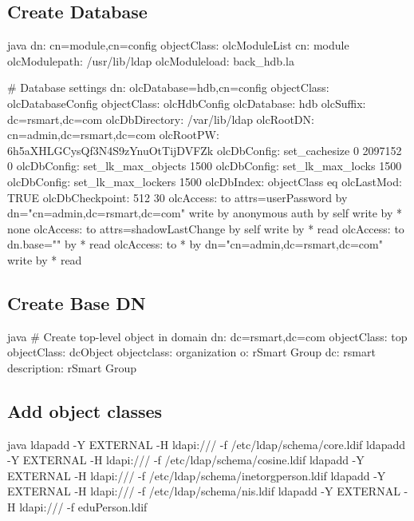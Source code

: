 \documentclass[12pt,notitlepage]{article}
\begin{document}
\begin{s5presentation}
\begin{s5slide}
    \W \end{s5slide}

%
%
  \W \begin{s5slide}
    \section{Create Database}
    \begin{code}{java}
dn: cn=module,cn=config
objectClass: olcModuleList
cn: module
olcModulepath: /usr/lib/ldap
olcModuleload: back_hdb.la

# Database settings
dn: olcDatabase=hdb,cn=config
objectClass: olcDatabaseConfig
objectClass: olcHdbConfig
olcDatabase: hdb
olcSuffix: dc=rsmart,dc=com
olcDbDirectory: /var/lib/ldap
olcRootDN: cn=admin,dc=rsmart,dc=com
olcRootPW: 6h5aXHLGCysQf3N4S9zYnuOtTijDVFZk
olcDbConfig: set_cachesize 0 2097152 0
olcDbConfig: set_lk_max_objects 1500
olcDbConfig: set_lk_max_locks 1500
olcDbConfig: set_lk_max_lockers 1500
olcDbIndex: objectClass eq
olcLastMod: TRUE
olcDbCheckpoint: 512 30
olcAccess: to attrs=userPassword by dn="cn=admin,dc=rsmart,dc=com" write by anonymous auth by self write by * none
olcAccess: to attrs=shadowLastChange by self write by * read
olcAccess: to dn.base="" by * read
olcAccess: to * by dn="cn=admin,dc=rsmart,dc=com" write by * read\
    \end{code}

    \W \end{s5slide}


%
%
  \W \begin{s5slide}
    \section{Create Base DN}
    \begin{code}{java}
# Create top-level object in domain
dn: dc=rsmart,dc=com
objectClass: top
objectClass: dcObject
objectclass: organization
o: rSmart Group
dc: rsmart
description: rSmart Group
    \end{code}

    \W \end{s5slide}

%
%
  \W \begin{s5slide}
    \section{Add object classes}
\begin{code}{java}
ldapadd -Y EXTERNAL -H ldapi:/// -f /etc/ldap/schema/core.ldif
ldapadd -Y EXTERNAL -H ldapi:/// -f /etc/ldap/schema/cosine.ldif
ldapadd -Y EXTERNAL -H ldapi:/// -f /etc/ldap/schema/inetorgperson.ldif
ldapadd -Y EXTERNAL -H ldapi:/// -f /etc/ldap/schema/nis.ldif
ldapadd -Y EXTERNAL -H ldapi:/// -f eduPerson.ldif
\end{code}


\end{s5slide}
\end{s5presentation}
\end{document}
